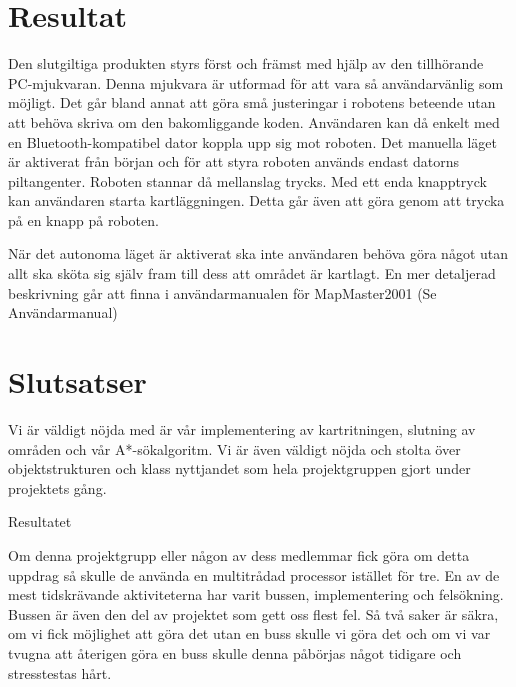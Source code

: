 \documentclass[a4paper,12pt,fleqn]{article}
\begin{document}
\section{Resultat}

Den slutgiltiga produkten styrs först och främst med hjälp av den tillhörande PC-mjukvaran. Denna mjukvara är utformad för att vara så användarvänlig som möjligt. Det går bland annat att göra små justeringar i robotens beteende utan att behöva skriva om den bakomliggande koden. Användaren kan då enkelt med en Bluetooth-kompatibel dator koppla upp sig mot roboten. Det manuella läget är aktiverat från början och för att styra roboten används endast datorns piltangenter. Roboten stannar då mellanslag trycks. Med ett enda knapptryck kan användaren starta kartläggningen. Detta går även att göra genom att trycka på en knapp på roboten.

När det autonoma läget är aktiverat ska inte användaren behöva göra något utan allt ska sköta sig själv fram till dess att området är kartlagt. En mer detaljerad beskrivning går att finna i användarmanualen för MapMaster2001 (Se Användarmanual)




\section{Slutsatser}




Vi är väldigt nöjda med är vår implementering av kartritningen, slutning av områden och vår A*-sökalgoritm. Vi är även väldigt nöjda och stolta över objektstrukturen och klass nyttjandet som hela projektgruppen gjort under projektets gång.

Resultatet 



Om denna projektgrupp eller någon av dess medlemmar fick göra om detta uppdrag så skulle de använda en multitrådad processor istället för tre. En av de mest tidskrävande aktiviteterna har varit bussen, implementering och felsökning. Bussen är även den del av projektet som gett oss flest fel. Så två saker är säkra, om vi fick möjlighet att göra det utan en buss skulle vi göra det och om vi var tvugna att återigen göra en buss skulle denna påbörjas något tidigare och stresstestas hårt.
\end{document}
